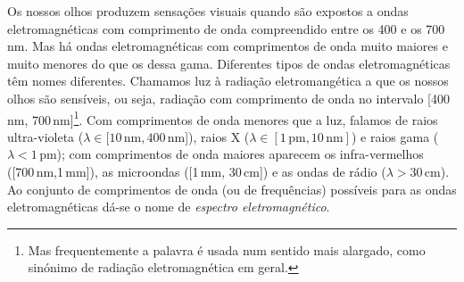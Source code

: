 Os nossos olhos produzem sensações visuais quando são expostos a ondas
eletromagnéticas com comprimento de onda compreendido entre os 400 e os 700\,nm.
Mas há ondas eletromagnéticas com comprimentos de onda muito maiores e muito
menores do que os dessa gama. Diferentes tipos de ondas eletromagnéticas têm
nomes diferentes. Chamamos luz à radiação eletromangética a que os nossos olhos
são sensíveis, ou seja, radiação com comprimento de onda no intervalo [400\,nm,
700\,nm]\footnote{Mas frequentemente a palavra é usada
    num sentido mais alargado, como sinónimo de radiação eletromagnética em
geral.}. Com comprimentos de onda menores que a luz, falamos de raios
ultra-violeta ($\lambda\in[10\,\text{nm},400\,\text{nm}$]), raios X
($\lambda\in[1\,\text{pm},10\,\text{nm}]$) e raios gama ($\lambda<1\,$pm); com comprimentos de onda maiores
aparecem os infra-vermelhos ([700\,nm,1\,mm]), as microondas ([1\,mm, 30\,cm]) e
as ondas de rádio ($\lambda>30$\,cm). Ao conjunto de comprimentos de onda (ou de
frequências) possíveis para as ondas eletromagnéticas dá-se o nome de
\emph{espectro eletromagnético}.

